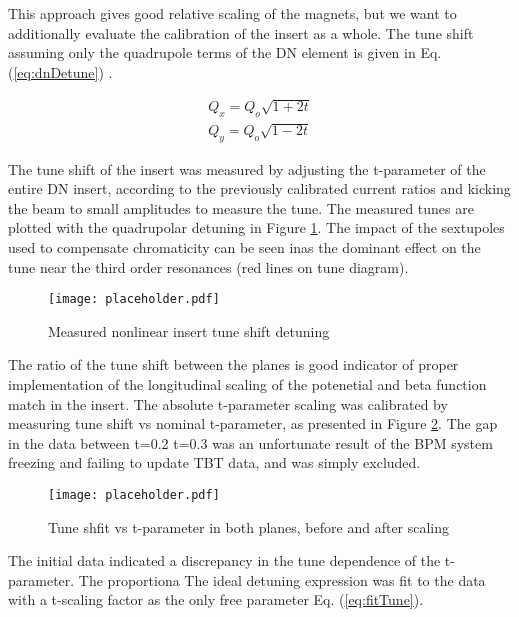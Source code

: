 This approach gives good relative scaling of the magnets, but we want to additionally evaluate the calibration of the insert as a whole. The tune shift assuming only the quadrupole terms of the DN element is given in Eq. (\ref{eq:dnDetune}) \cite{nagaitsevNonlinearOptics}.

\begin{equation}
	\begin{split}
	Q_{x} = Q_{o}\sqrt{1+2t} \\
        Q_{y} = Q_{o}\sqrt{1-2t}
	\end{split}
	\label{eq:dnDetune}
\end{equation}

The tune shift of the insert was measured by adjusting the t-parameter of the entire DN insert, according to the previously calibrated current ratios and kicking the beam to small amplitudes to measure the tune. The measured tunes are plotted with the quadrupolar detuning in Figure \ref{fig:dnDetuning}. The impact of the sextupoles used to compensate chromaticity can be seen inas the dominant effect on the tune near the third order resonances (red lines on tune diagram).

\begin{figure}
    \centering
    \texttt{[image: placeholder.pdf]}
    \caption{Measured nonlinear insert tune shift detuning}
    \label{fig:dnDetuning}
\end{figure}

The ratio of the tune shift between the planes is good indicator of proper implementation of the longitudinal scaling of the potenetial and beta function match in the insert. The absolute t-parameter scaling was calibrated by measuring tune shift vs nominal t-parameter, as presented in Figure \ref{fig:dnTuneVsT}. The gap in the data between t=0.2 t=0.3 was an unfortunate result of the BPM system freezing and failing to update TBT data, and was simply excluded.

\begin{figure}
    \centering
    \texttt{[image: placeholder.pdf]}
    \caption{Tune shfit vs t-parameter in both planes, before and after scaling}
    \label{fig:dnTuneVsT}
\end{figure}

The initial data indicated a discrepancy in the tune dependence of the t-parameter. The proportiona The ideal detuning expression was fit to the data with a t-scaling factor as the only free parameter Eq. (\ref{eq:fitTune}). 

